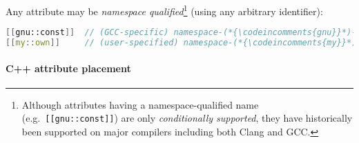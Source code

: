 \documentclass[twoside,10pt,letterpaper,usenames]{newstyle-PearsonGeneric-7-38}
\newcommand{\codeincomments}{\color{skyblue}\ttfamily}
\begin{document}
Any attribute may be \emph{namespace qualified}{\cprotect\footnote{Although
attributes having a namespace-qualified name
(e.g.~\texttt{[[gnu::const]]}) are only {\emph{conditionally
supported}}, they have historically been supported on major compilers
  including both Clang and GCC.}} (using any arbitrary identifier):

\begin{lstlisting}[language=C++]
[[gnu::const]]  // (GCC-specific) namespace-(*{\codeincomments{gnu}}*)-qualified (*{\codeincomments{const}}*) attribute
[[my::own]]     // (user-specified) namespace-(*{\codeincomments{my}}*)-qualified (*{\codeincomments{own}}*) attribute
\end{lstlisting}
    

\paragraph[C++ attribute placement]{C++ attribute placement}\label{c++-attribute-placement}
\end{document}
